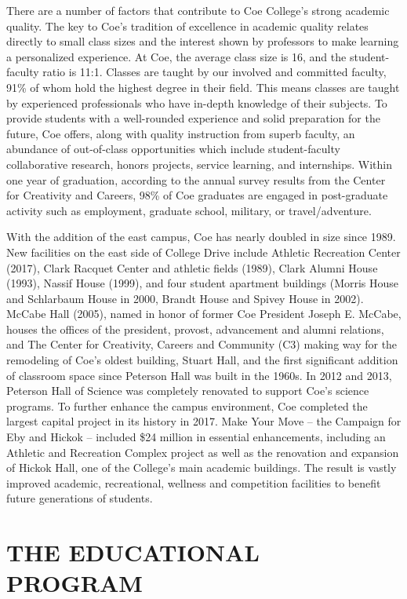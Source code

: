 \documentclass[
  letterpaper,
]{scrbook}
\begin{document}
There are a number of factors that contribute to Coe College's strong
academic quality. The key to Coe's tradition of excellence in academic
quality relates directly to small class sizes and the interest shown by
professors to make learning a personalized experience. At Coe, the
average class size is 16, and the student-faculty ratio is 11:1. Classes
are taught by our involved and committed faculty, 91\% of whom hold the
highest degree in their field. This means classes are taught by
experienced professionals who have in-depth knowledge of their subjects.
To provide students with a well-rounded experience and solid preparation
for the future, Coe offers, along with quality instruction from superb
faculty, an abundance of out-of-class opportunities which include
student-faculty collaborative research, honors projects, service
learning, and internships. Within one year of graduation, according to
the annual survey results from the Center for Creativity and Careers,
98\% of Coe graduates are engaged in post-graduate activity such as
employment, graduate school, military, or travel/adventure.

With the addition of the east campus, Coe has nearly doubled in size
since 1989. New facilities on the east side of College Drive include
Athletic Recreation Center (2017), Clark Racquet Center and athletic
fields (1989), Clark Alumni House (1993), Nassif House (1999), and four
student apartment buildings (Morris House and Schlarbaum House in 2000,
Brandt House and Spivey House in 2002). McCabe Hall (2005), named in
honor of former Coe President Joseph E. McCabe, houses the offices of
the president, provost, advancement and alumni relations, and The Center
for Creativity, Careers and Community (C3) making way for the remodeling
of Coe's oldest building, Stuart Hall, and the first significant
addition of classroom space since Peterson Hall was built in the 1960s.
In 2012 and 2013, Peterson Hall of Science was completely renovated to
support Coe's science programs. To further enhance the campus
environment, Coe completed the largest capital project in its history in
2017. Make Your Move -- the Campaign for Eby and Hickok -- included \$24
million in essential enhancements, including an Athletic and Recreation
Complex project as well as the renovation and expansion of Hickok Hall,
one of the College's main academic buildings. The result is vastly
improved academic, recreational, wellness and competition facilities to
benefit future generations of students.

\part{THE EDUCATIONAL PROGRAM}
\end{document}
